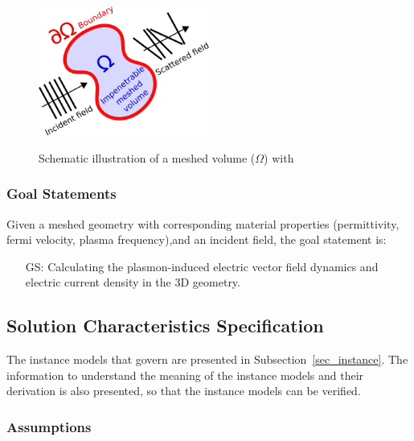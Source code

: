 \documentclass[12pt]{article}
\newcounter{goalnum} %
\begin{document}
	
	\begin{figure}[h!] \begin{center} %
			{ \includegraphics[width=0.5\textwidth]{physical_system.png} }
			\caption{\label{fig:system} Schematic illustration of a meshed volume
				($\Omega$) with  } \end{center} \end{figure}
	
	\subsubsection{Goal Statements} \label{goalstat} Given a meshed geometry with
	corresponding material properties (permittivity, fermi velocity, plasma
	frequency),and an incident field, the goal statement is:
	
	
	\begin{itemize}
		
		\item[GS\refstepcounter{goalnum}\thegoalnum \label{GS1}:] Calculating the
		plasmon-induced electric vector field dynamics and electric current density in
		the 3D geometry.
		
	\end{itemize}
	
	\subsection{Solution Characteristics Specification}
	
	
	The instance models that govern \progname{} are presented in
	Subsection~\ref{sec_instance}.  The information to understand the meaning of
	the instance models and their derivation is also presented, so that the
	instance models can be verified.
	
	\subsubsection{Assumptions} \label{sec_assumpt}
	
\end{document}
